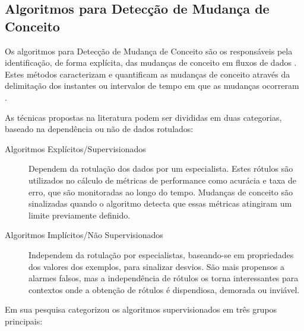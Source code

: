 \documentclass[qual, classic, a4paper]{ufbathesis}
\begin{document}
\subsection{Algoritmos para Detecção de Mudança de Conceito}

Os algoritmos para Detecção de Mudança de Conceito são os responsáveis pela identificação, de forma explícita, das mudanças de conceito em fluxos de dados \cite{Gama:2014:SCD:2597757.2523813}.
Estes métodos caracterizam e quantificam as mudanças de conceito através da delimitação dos instantes ou intervalos de tempo em que as mudanças ocorreram \cite{Basseville:1993:DAC:151741}.

As técnicas propostas na literatura podem ser divididas em duas categorias, baseado na dependência ou não de dados rotulados:
\begin{description}
    \item[Algoritmos Explícitos/Supervisionados] Dependem da rotulação dos dados por um especialista.
    Estes rótulos são utilizados no cálculo de métricas de performance como acurácia e taxa de erro, que são monitoradas ao longo do tempo.
    Mudanças de conceito são sinalizadas quando o algoritmo detecta que essas métricas atingiram um limite previamente definido.

    \item[Algoritmos Implícitos/Não Supervisionados] Independem da rotulação por especialistas, 
    baseando-se em propriedades dos valores dos exemplos, para sinalizar desvios.
    São mais propensos a alarmes falsos, mas a independência de rótulos os torna interessantes para contextos onde a obtenção de rótulos é dispendiosa, demorada ou inviável.
\end{description}

Em sua pesquisa \cite{Gama:2014:SCD:2597757.2523813} categorizou os algoritmos supervisionados em três grupos principais:
\end{document}
